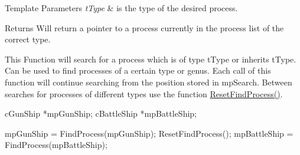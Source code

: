 \begin{DoxyTemplParams}{Template Parameters}
{\em tType} & is the type of the desired process. \\
\hline
\end{DoxyTemplParams}
\begin{DoxyReturn}{Returns}
Will return a pointer to a process currently in the process list of the correct type.
\end{DoxyReturn}
This Function will search for a process which is of type tType or inherits tType. Can be used to find processes of a certain type or genus. Each call of this function will continue searching from the position stored in mpSearch. Between searches for processes of different types use the function \hyperlink{classc_kernel_a42d5d224af7acfe4aee27b7cee2b0a02}{ResetFindProcess()}. 
\begin{DoxyCode}
        cGunShip *mpGunShip;
        cBattleShip *mpBattleShip;

        mpGunShip = FindProcess(mpGunShip);
        ResetFindProcess();
        mpBattleShip = FindProcess(mpBattleShip);
\end{DoxyCode}
 